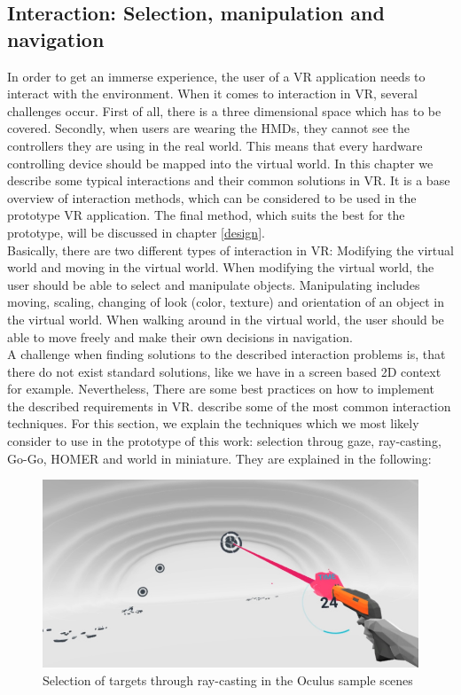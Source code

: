 \subsection{Interaction: Selection, manipulation and navigation}
\label{interaction-state-of-art}
In order to get an immerse experience, the user of a VR application needs to interact with the environment. When it comes to interaction in VR, several challenges occur. First of all, there is a three dimensional space which has to be covered. Secondly, when users are wearing the HMDs, they cannot see the controllers they are using in the real world. This means that every hardware controlling device should be mapped into the virtual world. In this chapter we describe some typical interactions and their common solutions in VR. It is a base overview of interaction methods, which can be considered to be used in the prototype VR application. The final method, which suits the best for the prototype, will be discussed in chapter \ref{design}.\\
Basically, there are two different types of interaction in VR: Modifying the virtual world and moving in the virtual world. When modifying the virtual world, the user should be able to select and manipulate objects. Manipulating includes moving, scaling, changing of look (color, texture) and orientation of an object in the virtual world. When walking around in the virtual world, the user should be able to move freely and make their own decisions in navigation. \cite{Dorner.2013}\\
A challenge when finding solutions to the described interaction problems is, that there do not exist standard solutions, like we have in a screen based 2D context for example. Nevertheless, There are some best practices on how to implement the described requirements in VR. \cite{Dorner.2013} describe some of the most common interaction techniques. For this section, we explain the techniques which we most likely consider to use in the prototype of this work: selection throug gaze, ray-casting, Go-Go, HOMER and world in miniature. They are explained in the following:
\begin{figure}[h!]
	\includegraphics[width=14cm]{kapitel/ray-casting.jpg}
	\centering
	\caption{Selection of targets through ray-casting in the Oculus sample scenes \cite{Goldstone.2015}}
	\label{fig:ray-casting}
\end{figure}
